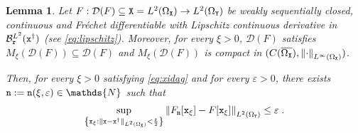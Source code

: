 \documentclass[10pt]{article}
\numberwithin{equation}{section}
\newtheorem{lemma}{Lemma}[section]
\theoremstyle{nonumberplain}
\newcommand{\N}{\mathds{N}}
\newcommand{\dom}[1]{\mathcal{D}\left(#1\right)}
\newcommand{\norm}[1]{\left\|#1\right\|}
\newcommand{\set}[1]{\left\{#1\right\}}
\newcommand{\ve}{\varepsilon}
\newcommand{\X}{{\tt X}}
\newcommand{\Y}{{\tt Y}}
\newcommand{\n}{{\tt n}}
\newcommand{\x}{{\tt x}}
\newcommand{\xdag}{\x^\dagger}
\begin{document}
\begin{lemma}\label{le:l2 operator apxa}
	Let $F: \mathcal{D}(F) \subseteq \X=L^2(\Omega_\X) \to L^2(\Omega_\Y)$ be weakly sequentially closed, continuous and Fr\'echet differentiable with Lipschitz continuous derivative in $\mathcal{B}^{L^2}_{\tt r}(\xdag)$ (see \autoref{eq:lipschitz}). Moreover, for every $\xi > 0$, $\dom{F}$ satisfies $M_\xi(\dom{F}) \subseteq \dom{F}$ and $M_\xi(\dom{F})$ is compact in $(C(\overline{\Omega_\X}),\norm{\cdot}_{L^\infty(\Omega_\X)})$.

Then, for every $\xi > 0$ satisfying \autoref{eq:xidag} and for every $\ve > 0$, 
	there exists $\n:=\n(\xi,\ve) \in \N$ such that 	
    \begin{equation} \label{eq:help3}
			\begin{aligned}
				\sup_{\set{\x_\xi:\norm{\x-\xdag}_{L^2(\Omega_\X)} < \frac{\tt r}{2}}} \norm{F_{\n}[\x_\xi]-F[\x_\xi]}_{L^2(\Omega_\Y)} &\leq \ve\;.\\
			\end{aligned}
		\end{equation}
\end{lemma}
\end{document}
